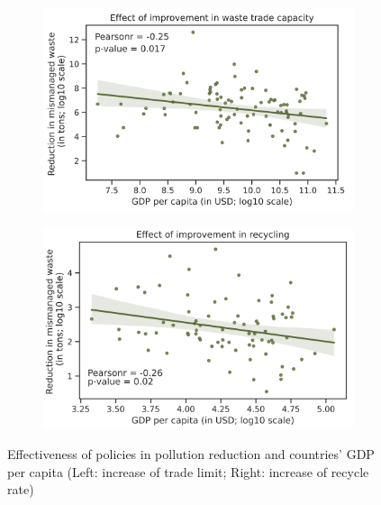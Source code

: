 \documentclass[dvipsnames]{article}
\begin{document}
\begin{figure}[htb!]
	\centering
	\begin{subfigure}{0.48\textwidth}
		\centering 
		\includegraphics[width=\textwidth]{Improvement_GDP_waste_capacity.png}
	\end{subfigure}
	\begin{subfigure}{0.48\textwidth}
		\centering
		\includegraphics[width=\textwidth]{Improvement_GDP_recycling.png}	
	\end{subfigure}
	\caption{\small Effectiveness of policies in pollution reduction and countries' GDP per capita (Left: increase of trade limit; Right: increase of recycle rate)}
	\label{fig:rec_gdp}
\end{figure}
\end{document}

